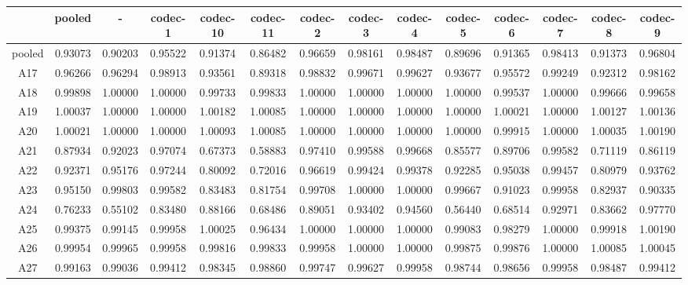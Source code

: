 \begin{tabular}{cccccccccccccc}
    \toprule
           &  pooled  &    -     & codec-1  & codec-10 & codec-11 & codec-2  & codec-3  & codec-4  & codec-5  & codec-6  & codec-7  & codec-8  & codec-9 \\ 
    \midrule
    pooled &  0.93073 &  0.90203 &  0.95522 &  0.91374 &  0.86482 &  0.96659 &  0.98161 &  0.98487 &  0.89696 &  0.91365 &  0.98413 &  0.91373 &  0.96804\\ 
     A17   &  0.96266 &  0.96294 &  0.98913 &  0.93561 &  0.89318 &  0.98832 &  0.99671 &  0.99627 &  0.93677 &  0.95572 &  0.99249 &  0.92312 &  0.98162\\ 
     A18   &  0.99898 &  1.00000 &  1.00000 &  0.99733 &  0.99833 &  1.00000 &  1.00000 &  1.00000 &  1.00000 &  0.99537 &  1.00000 &  0.99666 &  0.99658\\ 
     A19   &  1.00037 &  1.00000 &  1.00000 &  1.00182 &  1.00085 &  1.00000 &  1.00000 &  1.00000 &  1.00000 &  1.00021 &  1.00000 &  1.00127 &  1.00136\\ 
     A20   &  1.00021 &  1.00000 &  1.00000 &  1.00093 &  1.00085 &  1.00000 &  1.00000 &  1.00000 &  1.00000 &  0.99915 &  1.00000 &  1.00035 &  1.00190\\ 
     A21   &  0.87934 &  0.92023 &  0.97074 &  0.67373 &  0.58883 &  0.97410 &  0.99588 &  0.99668 &  0.85577 &  0.89706 &  0.99582 &  0.71119 &  0.86119\\ 
     A22   &  0.92371 &  0.95176 &  0.97244 &  0.80092 &  0.72016 &  0.96619 &  0.99424 &  0.99378 &  0.92285 &  0.95038 &  0.99457 &  0.80979 &  0.93762\\ 
     A23   &  0.95150 &  0.99803 &  0.99582 &  0.83483 &  0.81754 &  0.99708 &  1.00000 &  1.00000 &  0.99667 &  0.91023 &  0.99958 &  0.82937 &  0.90335\\ 
     A24   &  0.76233 &  0.55102 &  0.83480 &  0.88166 &  0.68486 &  0.89051 &  0.93402 &  0.94560 &  0.56440 &  0.68514 &  0.92971 &  0.83662 &  0.97770\\ 
     A25   &  0.99375 &  0.99145 &  0.99958 &  1.00025 &  0.96434 &  1.00000 &  1.00000 &  1.00000 &  0.99083 &  0.98279 &  1.00000 &  0.99918 &  1.00190\\ 
     A26   &  0.99954 &  0.99965 &  0.99958 &  0.99816 &  0.99833 &  0.99958 &  1.00000 &  1.00000 &  0.99875 &  0.99876 &  1.00000 &  1.00085 &  1.00045\\ 
     A27   &  0.99163 &  0.99036 &  0.99412 &  0.98345 &  0.98860 &  0.99747 &  0.99627 &  0.99958 &  0.98744 &  0.98656 &  0.99958 &  0.98487 &  0.99412\\ 

\end{tabular}
